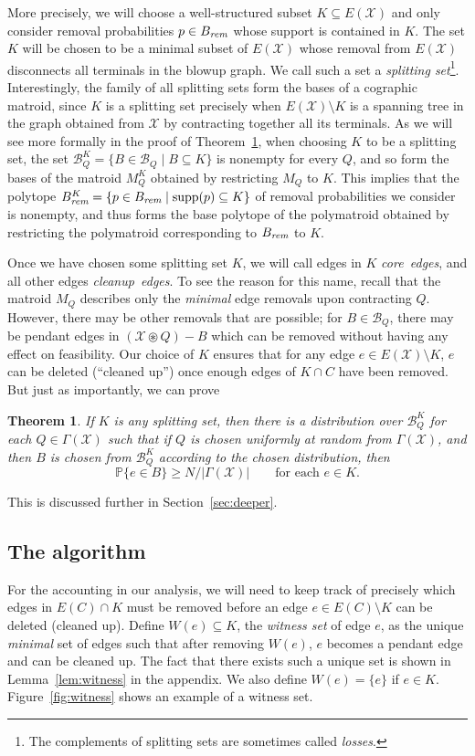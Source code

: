 \documentclass[11pt, letterpaper]{article}
\newtheorem{theorem}{Theorem}[section]
\theoremstyle{definition}
\newcommand{\grphx}{\mathcal{X}}
\newcommand{\compof}[1]{\Gamma(#1)}
\newcommand{\compx}{\compof{\grphx}}
\newcommand{\remove}{-}
\newcommand{\contract}{\circledast}
\newcommand{\grd}{E(\grphx)}
\newcommand{\core}{K}
\newcommand{\remP}{B_{\text{\it rem}}}
\newcommand{\remPcore}{B_{\text{\it rem}}^\core}
\newcommand{\primary}{core}
\newcommand{\secondary}{cleanup}
\newcommand{\card}[1]{\lvert#1\rvert}
\renewcommand{\Pr}[1]{\mathbb{P}\{#1\}}
\DeclareMathOperator{\supp}{supp}
\begin{document}
More precisely, we will choose a well-structured subset $\core\subseteq \grd$ and only consider
removal probabilities $p\in \remP$
whose support is contained in $\core$.
The set $\core$ will be chosen to be a minimal subset of $\grd$ whose removal
from $\grd$ disconnects all terminals in the blowup graph.
We call such a set a \emph{splitting set}\footnote{The
complements of splitting sets are sometimes
called \emph{losses}.}.
Interestingly, the family of all splitting sets form the bases
of a cographic matroid, since $K$ is a splitting set precisely when
$E(\grphx)\setminus K$ is a spanning tree in the graph obtained
from $\grphx$ by contracting together all its terminals.
As we will see more formally in the proof of Theorem~\ref{thm:uniform}, when choosing $K$ to be a
splitting set, the set
$\mathcal{B}_Q^K=\{B\in \mathcal{B}_Q\mid B\subseteq K\}$
is nonempty for every $Q$, and so form the bases
of the matroid $M_Q^K$ obtained by restricting $M_Q$ to $K$.
This implies that the polytope 
$\remPcore=\{p\in \remP\mid \supp(p)\subseteq \core\}$
of removal probabilities we consider is nonempty, and
thus forms the base polytope of the polymatroid
obtained by restricting the polymatroid corresponding
to $\remP$ to $K$. 

Once we have chosen some splitting set $K$,
we will call edges in $K$ \emph{\primary\ edges}, and all
other edges \emph{\secondary\ edges}.
To see the reason for this name, recall that the matroid $M_Q$ describes only the \emph{minimal} edge removals upon contracting $Q$. 
However, there may be other removals that are possible; for $B \in \mathcal{B}_Q$, there may be pendant edges in $(\grphx \contract Q) \remove B$ which can be removed without having any effect on feasibility.
Our choice of $\core$ ensures that for any edge $e \in E(\grphx) \setminus \core$, $e$ can be deleted (``cleaned up'') once enough edges of $\core \cap C$ have been removed.
But just as importantly, we can prove
\begin{theorem}\label{thm:uniform}
	If $\core$ is any splitting set, then there is a distribution over $\mathcal{B}^K_{Q}$ for each $Q \in \compx$ such that if $Q$ is chosen uniformly at random from $\compx$, and then $B$ is chosen from $\mathcal{B}_{Q}^K$ according to the chosen distribution, then
	\[ \Pr{e \in B} \geq N/\card{\compx} \qquad \text{for each } e \in \core. \]
\end{theorem}
This is discussed further in Section~\ref{sec:deeper}.
\subsection{The algorithm}\label{sec:alg}
For the accounting in our analysis, we will need to keep track of precisely which edges in $E(C) \cap \core$ must be removed before an edge $e \in E(C) \setminus \core$ can be deleted (cleaned up). 
Define $W(e) \subseteq \core$, the \emph{witness set} of edge $e$, as the unique \emph{minimal} set of edges such that after removing $W(e)$, $e$ becomes a pendant edge and can be cleaned up.
The fact that there exists such a unique set is shown in Lemma~\ref{lem:witness} in the appendix.
We also define $W(e) = \{e\}$ if $e \in \core$.
Figure~\ref{fig:witness} shows an example of a witness set.
\end{document}
